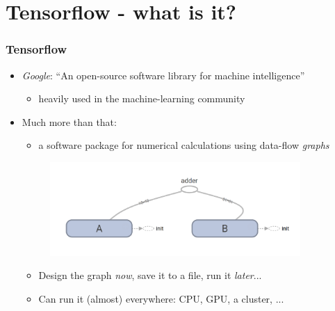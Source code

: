 \documentclass{beamer}
\begin{document}
\section{Tensorflow - what is it?}
\begin{frame}
\frametitle{Tensorflow}
\begin{itemize}
  \item \textsl{Google}: ``An open-source software library for machine intelligence''
    \begin{itemize}
      \item heavily used in the machine-learning community
    \end{itemize}
  \item Much more than that:
    \begin{itemize}
      \item a software package for numerical calculations using data-flow \textsl{graphs}
    \end{itemize}

    \begin{figure}
      \centering
      \includegraphics[width = 0.9\textwidth]{../ExampleGraph.png}
    \end{figure}

    \begin{itemize}
      \item Design the graph \textsl{now}, save it to a file, run it \textsl{later}...
      \item Can run it (almost) everywhere: CPU, GPU, a cluster, ...
    \end{itemize}
\end{itemize}
\end{frame}
\end{document}
